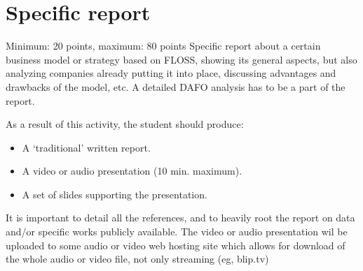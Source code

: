 \documentclass[11pt]{scrartcl}
\begin{document}
\section{Specific report}

Minimum: 20 points, maximum: 80 points
Specific report about a certain business model or strategy based on FLOSS, showing its general aspects, but also analyzing companies already putting it into place, discussing advantages and drawbacks of the model, etc. A detailed DAFO analysis has to be a part of the report.

As a result of this activity, the student should produce:
\begin{itemize}
    \item A ‘traditional’ written report.
    \item A video or audio presentation (10 min. maximum).
    \item A set of slides supporting the presentation.
\end{itemize}

It is important to detail all the references, and to heavily root the report on data and/or specific works publicly available. The video or audio presentation wil be uploaded to some audio or video web hosting site which allows for download of the whole audio or video file, not only streaming (eg, blip.tv)
\end{document}
